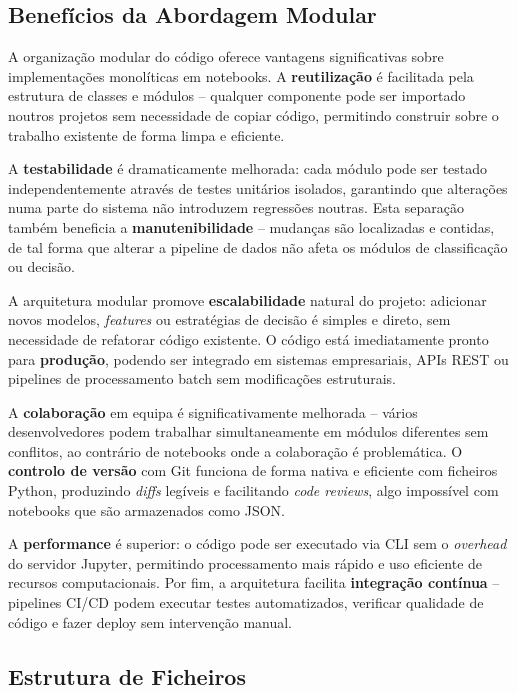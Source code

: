 \documentclass[12pt, a4paper]{article}
\begin{document}
\subsection{Benefícios da Abordagem Modular}

A organização modular do código oferece vantagens significativas sobre implementações monolíticas em notebooks. A \textbf{reutilização} é facilitada pela estrutura de classes e módulos -- qualquer componente pode ser importado noutros projetos sem necessidade de copiar código, permitindo construir sobre o trabalho existente de forma limpa e eficiente.

A \textbf{testabilidade} é dramaticamente melhorada: cada módulo pode ser testado independentemente através de testes unitários isolados, garantindo que alterações numa parte do sistema não introduzem regressões noutras. Esta separação também beneficia a \textbf{manutenibilidade} -- mudanças são localizadas e contidas, de tal forma que alterar a pipeline de dados não afeta os módulos de classificação ou decisão.

A arquitetura modular promove \textbf{escalabilidade} natural do projeto: adicionar novos modelos, \textit{features} ou estratégias de decisão é simples e direto, sem necessidade de refatorar código existente. O código está imediatamente pronto para \textbf{produção}, podendo ser integrado em sistemas empresariais, APIs REST ou pipelines de processamento batch sem modificações estruturais.

A \textbf{colaboração} em equipa é significativamente melhorada -- vários desenvolvedores podem trabalhar simultaneamente em módulos diferentes sem conflitos, ao contrário de notebooks onde a colaboração é problemática. O \textbf{controlo de versão} com Git funciona de forma nativa e eficiente com ficheiros Python, produzindo \textit{diffs} legíveis e facilitando \textit{code reviews}, algo impossível com notebooks que são armazenados como JSON.

A \textbf{performance} é superior: o código pode ser executado via CLI sem o \textit{overhead} do servidor Jupyter, permitindo processamento mais rápido e uso eficiente de recursos computacionais. Por fim, a arquitetura facilita \textbf{integração contínua} -- pipelines CI/CD podem executar testes automatizados, verificar qualidade de código e fazer deploy sem intervenção manual.

\subsection{Estrutura de Ficheiros}
\end{document}
